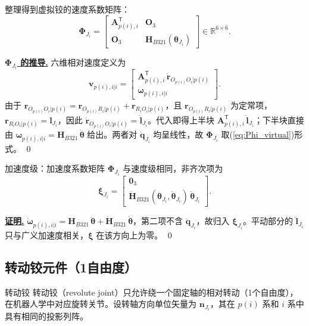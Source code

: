 \documentclass[10pt,a4paper]{book}
\theoremstyle{thmstyle}
\theoremstyle{defstyle}
\theoremstyle{prostyle}
\renewenvironment{proof}[1][证明]{\par{\kaishu \underline{\textbf{#1.}}} \;\fangsong}{\qed\par}
\newcommand{\T}{^{\mathsf{T}}}
\renewcommand{\vec}[1]{\bm{#1}}
\newcommand{\mat}[1]{\bm{#1}}
\newcommand{\R}{\mathbb{R}}
\begin{document}
整理得到虚拟铰的速度系数矩阵：
\begin{equation}
\mat{\Phi}_{J_i} =
\begin{bmatrix}
\mat{A}_{p(i),i}\T & \mat{O}_3 \\
\mat{O}_3 & \mat{H}_{B321}(\vec{\theta}_{J_i})
\end{bmatrix}\in\R^{6\times 6}.
\label{eq:Phi_virtual}
\end{equation}

\begin{proof}[$\mat{\Phi}_{J_i}$ 的推导]
六维相对速度定义为
\[
\vec{v}_{p(i),i|i} = \begin{bmatrix}
\mat{A}_{p(i),i}\T\,\dot{\vec{r}}_{O_{p(i)}O_i|p(i)} \\
\vec{\omega}_{p(i),i|i}
\end{bmatrix}.
\]
由于 $\vec{r}_{O_{p(i)}O_i|p(i)} = \vec{r}_{O_{p(i)}R_i|p(i)} + \vec{r}_{R_iO_i|p(i)}$，且 $\vec{r}_{O_{p(i)}R_i|p(i)}$ 为定常项，$\vec{r}_{R_iO_i|p(i)} = \vec{l}_{J_i}$，因此 $\dot{\vec{r}}_{O_{p(i)}O_i|p(i)} = \dot{\vec{l}}_{J_i}$。代入即得上半块 $\mat{A}_{p(i),i}\T\,\dot{\vec{l}}_{J_i}$；下半块直接由 $\vec{\omega}_{p(i),i|i} = \mat{H}_{B321}\,\dot{\vec{\theta}}$ 给出。两者对 $\dot{\vec{q}}_{J_i}$ 均呈线性，故 $\mat{\Phi}_{J_i}$ 取(\ref{eq:Phi_virtual})形式。
\end{proof}

加速度级：加速度系数矩阵 $\mat{\Phi}_{J_i}$ 与速度级相同，非齐次项为
\begin{equation}
\vec{\xi}_{J_i} =
\begin{bmatrix}
\vec{0}_3 \\
\dot{\mat{H}}_{B321}(\vec{\theta}_{J_i},\dot{\vec{\theta}}_{J_i})\,\dot{\vec{\theta}}_{J_i}
\end{bmatrix}.
\label{eq:xi_virtual}
\end{equation}
\begin{proof}
$\dot{\vec{\omega}}_{p(i),i|i} = \mat{H}_{B321}\,\ddot{\vec{\theta}} + \dot{\mat{H}}_{B321}\,\dot{\vec{\theta}}$，第二项不含 $\ddot{\vec{q}}_{J_i}$，故归入 $\vec{\xi}_{J_i}$。平动部分的 $\ddot{\vec{l}}_{J_i}$ 只与广义加速度相关，$\vec{\xi}$ 在该方向上为零。
\end{proof}

\subsection{转动铰元件（1自由度）}

\begin{mydefinition}{转动铰}
转动铰（revolute joint）只允许绕一个固定轴的相对转动（1个自由度），在机器人学中对应旋转关节。设转轴方向单位矢量为 $\vec{n}_{J_i}$，其在 $p(i)$ 系和 $i$ 系中具有相同的投影列阵。
\end{mydefinition}
\end{document}
